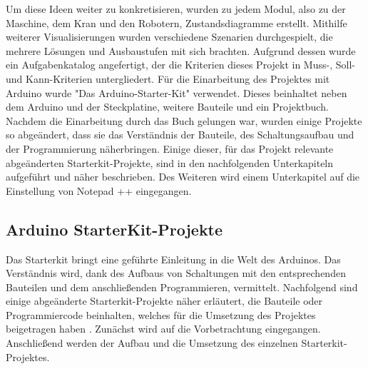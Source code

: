Um diese Ideen weiter zu konkretisieren,  wurden zu jedem Modul, also zu der Maschine, dem Kran und den Robotern, Zustandsdiagramme erstellt. Mithilfe weiterer Visualisierungen wurden verschiedene Szenarien durchgespielt, die mehrere Lösungen und Ausbaustufen mit sich brachten. Aufgrund dessen wurde ein Aufgabenkatalog angefertigt, der die Kriterien dieses Projekt in Muss-, Soll- und Kann-Kriterien untergliedert. Für die Einarbeitung
des Projektes mit Arduino wurde "Das Arduino-Starter-Kit" verwendet. Dieses beinhaltet
neben dem Arduino und der Steckplatine,  weitere Bauteile und ein Projektbuch. Nachdem die
Einarbeitung durch das Buch gelungen war, wurden einige Projekte so abgeändert, dass sie das Verständnis der Bauteile, des Schaltungsaufbau und der Programmierung näherbringen. Einige dieser, für das Projekt relevante abgeänderten Starterkit-Projekte, sind in den nachfolgenden Unterkapiteln aufgeführt und näher beschrieben. Des Weiteren wird einem Unterkapitel  auf die Einstellung von Notepad ++ eingegangen.



\subsection{Arduino StarterKit-Projekte}

Das Starterkit bringt eine geführte Einleitung in die Welt des Arduinos. Das Verständnis wird, dank des Aufbaus von
Schaltungen mit den entsprechenden Bauteilen und dem anschließenden Programmieren,
vermittelt. Nachfolgend sind einige abgeänderte Starterkit-Projekte näher erläutert, die Bauteile oder Programmiercode beinhalten, welches für die Umsetzung des Projektes beigetragen haben . Zunächst wird auf die Vorbetrachtung eingegangen. Anschließend werden der Aufbau und die Umsetzung des einzelnen Starterkit-Projektes.




